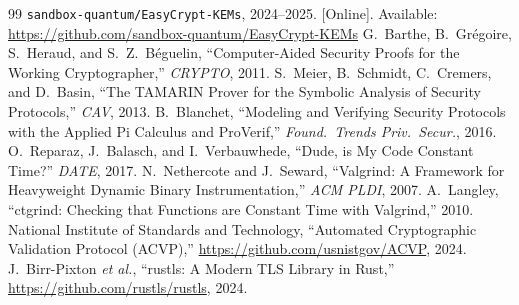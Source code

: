 \documentclass[journal]{IEEEtran}
\newcommand{\code}[1]{\texttt{\small #1}}
\begin{document}
\begin{thebibliography}{99}
\code{sandbox-quantum/EasyCrypt-KEMs}, 2024--2025. [Online]. Available:
\url{https://github.com/sandbox-quantum/EasyCrypt-KEMs}
 G.~Barthe, B.~Gr\'egoire, S.~Heraud, and S.~Z.~B\'eguelin, ``Computer-Aided
Security Proofs for the Working Cryptographer,'' \emph{CRYPTO}, 2011.
 S.~Meier, B.~Schmidt, C.~Cremers, and D.~Basin, ``The TAMARIN Prover for the
Symbolic Analysis of Security Protocols,'' \emph{CAV}, 2013.
 B.~Blanchet, ``Modeling and Verifying Security Protocols with the Applied Pi
Calculus and ProVerif,'' \emph{Found.\ Trends Priv.\ Secur.}, 2016.
 O.~Reparaz, J.~Balasch, and I.~Verbauwhede, ``Dude, is My Code Constant Time?''
\emph{DATE}, 2017.
 N.~Nethercote and J.~Seward, ``Valgrind: A Framework for Heavyweight Dynamic
Binary Instrumentation,'' \emph{ACM PLDI}, 2007.
 A.~Langley, ``ctgrind: Checking that Functions are Constant Time with Valgrind,''
2010.
 National Institute of Standards and Technology, ``Automated Cryptographic Validation
Protocol (ACVP),'' \url{https://github.com/usnistgov/ACVP}, 2024.
 J.~Birr-Pixton \emph{et al.}, ``rustls: A Modern TLS Library in Rust,''
\url{https://github.com/rustls/rustls}, 2024.
\end{thebibliography}

\end{document}
